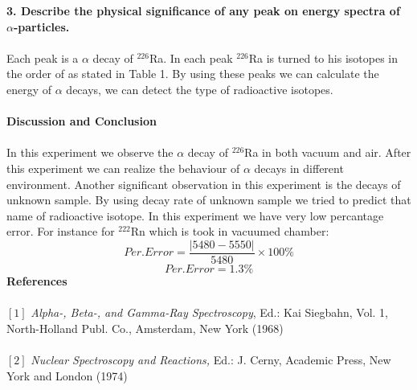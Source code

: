 \documentclass[a4paper,12pt]{article}
\begin{document}
\textbf{3. Describe the physical significance of any peak on energy spectra of $\alpha$-particles.}\\\\
Each peak is a $\alpha$ decay of $^{226}$Ra. In each peak $^{226}$Ra is turned to his isotopes in the order of as stated in Table 1. By using these peaks we can calculate the energy of $\alpha$ decays, we can detect the type of radioactive isotopes.\\\\
\textbf{Discussion and Conclusion }\\\\
In this experiment we observe the $\alpha$ decay of $^{226}$Ra in both vacuum and air. After this experiment we can realize the behaviour of $\alpha$ decays in different environment. Another significant observation in this experiment is the decays of unknown sample. By using decay rate of unknown sample we tried to predict that name of radioactive isotope. In this experiment we have very low percantage error. For instance for $^{222}$Rn which is took in vacuumed chamber:
\begin{equation}
Per. Error = \frac{|5480-5550|}{5480}\times 100 \%
\end{equation}
\begin{equation}
Per. Error = 1.3 \%
\end{equation}
\newpage
\textbf{References}\\\\
$[1]$ \textit{Alpha-, Beta-, and Gamma-Ray Spectroscopy},
Ed.: Kai Siegbahn, Vol. 1, North-Holland Publ. Co., Amsterdam, New York (1968)\\\\
$[2]$ \textit{Nuclear Spectroscopy and Reactions,}
Ed.: J. Cerny, Academic Press, New York and London (1974)


 
\end{document}
